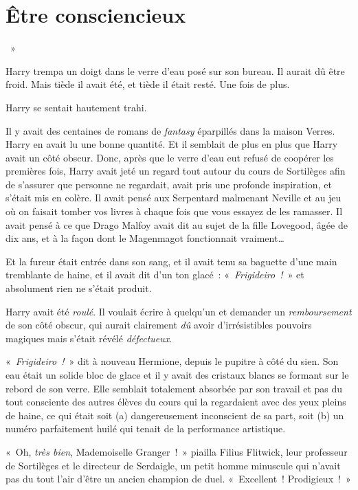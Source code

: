 \chapter{Être consciencieux}

~»

\hplettrineextrapara
Harry trempa un doigt dans le verre d'eau posé sur son bureau. Il aurait dû être froid. Mais tiède il avait été, et tiède il était resté. Une fois de plus.

Harry se sentait hautement trahi.

Il y avait des centaines de romans de \emph{fantasy} éparpillés dans la maison Verres. Harry en avait lu une bonne quantité. Et il semblait de plus en plus que Harry avait un côté obscur. Donc, après que le verre d'eau eut refusé de coopérer les premières fois, Harry avait jeté un regard tout autour du cours de Sortilèges afin de s'assurer que personne ne regardait, avait pris une profonde inspiration, et s'était mis en colère. Il avait pensé aux Serpentard malmenant Neville et au jeu où on faisait tomber vos livres à chaque fois que vous essayez de les ramasser. Il avait pensé à ce que Drago Malfoy avait dit au sujet de la fille Lovegood, âgée de dix ans, et à la façon dont le Magenmagot fonctionnait vraiment…

Et la fureur était entrée dans son sang, et il avait tenu sa baguette d'une main tremblante de haine, et il avait dit d'un ton glacé~: «~\emph{Frigideiro~!}~» et absolument rien ne s'était produit.

Harry avait été \emph{roulé}. Il voulait écrire à quelqu'un et demander un \emph{remboursement} de son côté obscur, qui aurait clairement \emph{dû} avoir d'irrésistibles pouvoirs magiques mais s'était révélé \emph{défectueux}.

«~\emph{Frigideiro~!}~» dit à nouveau Hermione, depuis le pupitre à côté du sien. Son eau était un solide bloc de glace et il y avait des cristaux blancs se formant sur le rebord de son verre. Elle semblait totalement absorbée par son travail et pas du tout consciente des autres élèves du cours qui la regardaient avec des yeux pleins de haine, ce qui était soit (a) dangereusement inconscient de sa part, soit (b) un numéro parfaitement huilé qui tenait de la performance artistique.

«~Oh, \emph{très bien}, Mademoiselle Granger~!~» piailla Filius Flitwick, leur professeur de Sortilèges et le directeur de Serdaigle, un petit homme minuscule qui n'avait pas du tout l'air d'être un ancien champion de duel. «~Excellent~! Prodigieux~!~»

